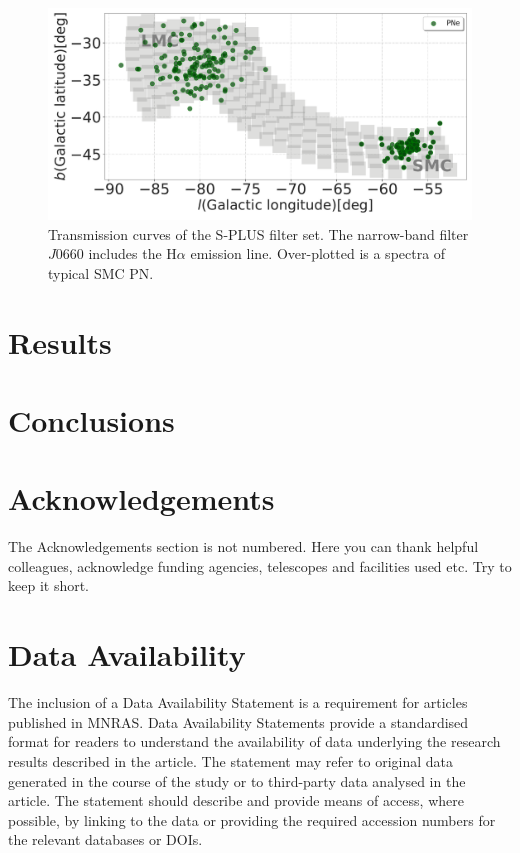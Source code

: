 \documentclass[fleqn,usenatbib]{mnras}
\begin{document}
\begin{figure}
    \includegraphics[width=\linewidth]{Figs/galactic-coord-pn.pdf}
    \caption{Transmission curves of the S-PLUS filter set. The narrow-band filter
      $J0660$ includes the H$\alpha$ emission line. Over-plotted is a spectra of typical SMC PN.}
    \label{fig:pn_mc}
\end{figure}


\section{Results}


\section{Conclusions}



\section*{Acknowledgements}

The Acknowledgements section is not numbered. Here you can thank helpful
colleagues, acknowledge funding agencies, telescopes and facilities used etc.
Try to keep it short.

\section*{Data Availability}

 
The inclusion of a Data Availability Statement is a requirement for articles published in MNRAS. Data Availability Statements provide a standardised format for readers to understand the availability of data underlying the research results described in the article. The statement may refer to original data generated in the course of the study or to third-party data analysed in the article. The statement should describe and provide means of access, where possible, by linking to the data or providing the required accession numbers for the relevant databases or DOIs.
\end{document}
